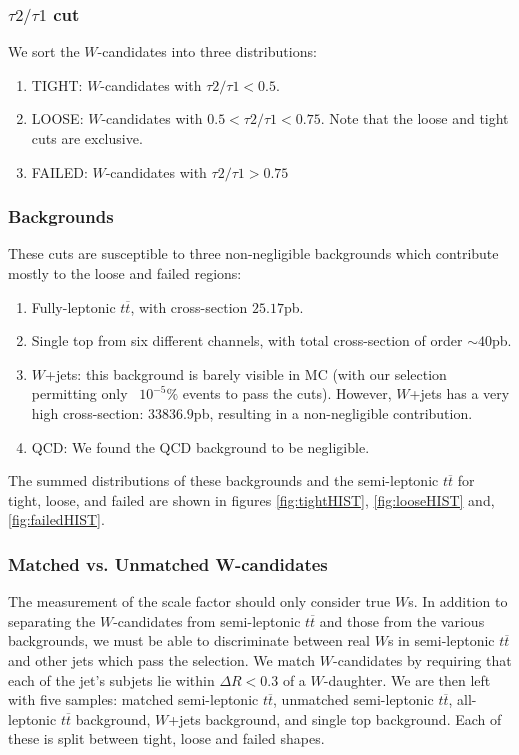 \subsubsection{$\tau 2/\tau 1$ cut}
We sort the $W$-candidates into three distributions:
\begin{enumerate}
\item
TIGHT: $W$-candidates with $\tau 2/\tau 1 < 0.5$.
\item
LOOSE: $W$-candidates with $0.5 < \tau 2/\tau 1 < 0.75$. Note that the loose and tight cuts are exclusive.
\item
FAILED: $W$-candidates with $\tau 2/\tau 1 > 0.75$
\end{enumerate}
\subsubsection{Backgrounds}
These cuts are susceptible to three non-negligible backgrounds which contribute mostly to the loose and failed regions:
\begin{enumerate}
\item
Fully-leptonic $t\overline{t}$, with cross-section $25.17$pb.
\item
Single top from six different channels, with total cross-section of order $\sim40$pb.
\item
$W$+jets: this background is barely visible in MC (with our selection permitting only ~$10^{-5}\%$ events to pass the cuts). However, $W$+jets has a very high cross-section: $33836.9$pb, resulting in a non-negligible contribution.
\item
QCD: We found the QCD background to be negligible.
\end{enumerate}
The summed distributions of these backgrounds and the semi-leptonic $t\overline{t}$ for tight, loose, and failed are shown in figures \ref{fig:tightHIST}, \ref{fig:looseHIST} and, \ref{fig:failedHIST}.
\subsubsection*{Matched vs. Unmatched W-candidates}
The measurement of the scale factor should only consider true $W$s. In addition to separating the $W$-candidates from semi-leptonic $t\overline{t}$ and those from the various backgrounds, we must be able to discriminate between real $W$s in semi-leptonic $t\overline{t}$ and other jets which pass the selection. We match $W$-candidates by requiring that each of the jet's subjets lie within $\Delta R < 0.3$ of a $W$-daughter.
We are then left with five samples: matched semi-leptonic $t\overline{t}$, unmatched semi-leptonic $t\overline{t}$, all-leptonic $t\overline{t}$ background, $W$+jets background, and single top background. Each of these is split between tight, loose and failed shapes. 
 
